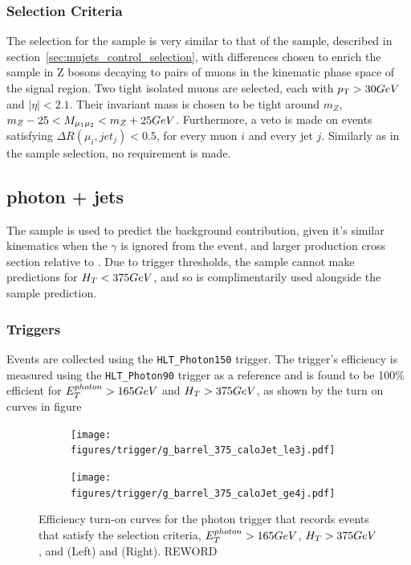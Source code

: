 \subsubsection{Selection Criteria}
The selection for the \mmj sample is very similar to that of the \mj sample, 
described in section~\ref{sec:mujets_control_selection}, with differences chosen
to enrich the sample in Z bosons decaying to pairs of muons in the kinematic 
phase space of the signal region. Two tight isolated muons are selected, each 
with ${p_{\text T}} > 30GeV$ and $|\eta| < 2.1$. Their invariant mass is chosen to be
tight around $m_Z$, $m_Z - 25 < M_{\mu_1\mu_2} < m_Z + 25 GeV$. Furthermore, a 
veto is made on events satisfying $\Delta R(\mu_i, jet_j) < 0.5$, for every muon 
$i$ and every jet $j$. Similarly as in the \mj sample selection, no \alphat
requirement is made.


\subsection{photon + jets}
The \gj sample is used to predict the \zinv background contribution, given it's 
similar kinematics when the $\gamma$ is ignored from the event, and larger 
production cross section relative to \mmj. Due to trigger thresholds, the \gj
sample cannot make predictions for $H_T<375GeV$, and so is complimentarily used
alongside the \mmj sample prediction.

\subsubsection{Triggers}
Events are collected using the \verb!HLT_Photon150! trigger. The trigger's 
efficiency is measured using the \verb!HLT_Photon90! trigger as a reference and
is found to be 100$\%$ efficient for $E_T^{photon}>165GeV$ and $H_T>375GeV$, 
as shown by the turn on curves in figure~

\begin{figure}[ht!]
  \centering
  \begin{subfigure}[b]{0.35\textwidth}
    \texttt{[image: figures/trigger/g\_barrel\_375\_caloJet\_le3j.pdf]}
    \caption{\njlow}
    \label{fig:photon_control_trigeff_le3j}
  \end{subfigure}
  \begin{subfigure}[b]{0.35\textwidth}
    \texttt{[image: figures/trigger/g\_barrel\_375\_caloJet\_ge4j.pdf]}
    \caption{\njhigh}
    \label{fig:photon_control_trigeff_ge4j}
  \end{subfigure}
  \caption{Efficiency turn-on curves for
      the photon trigger that records events that
      satisfy the \gj selection criteria, $E_{T}^{photon} > 165GeV$, $H_T > 375GeV$, and \njlow (Left) and \njhigh
      (Right). REWORD}
  \label{fig:photon_control_trigeff}
\end{figure}

